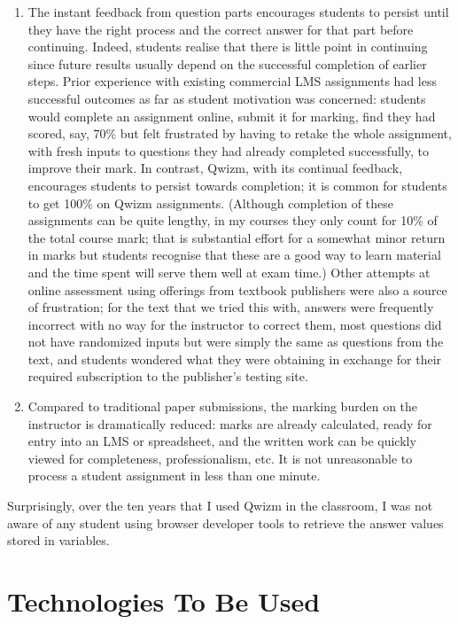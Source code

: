 \documentclass{tufte-handout}
\begin{document}
\begin{enumerate}
	\item The instant feedback from question parts encourages students to persist until they have the right process and the correct answer for that part before continuing. Indeed, students realise that there is little point in continuing since future results usually depend on the successful completion of earlier steps.
	\parm
Prior experience with existing commercial LMS assignments had less successful outcomes as far as student motivation was concerned: students would complete an assignment online, submit it for marking, find they had scored, say, 70\% but felt frustrated by having to retake the whole assignment, with fresh inputs to questions they had already completed successfully, to improve their mark. In contrast, Qwizm, with its continual feedback, encourages students to persist towards completion; it is common for students to get 100\% on Qwizm assignments.
\parm
(Although completion of these assignments can be quite lengthy, in my courses they only count for 10\% of the total course mark; that is substantial effort for a somewhat minor return in marks but students recognise that these are a good way to learn material and the time spent will serve them well at exam time.)
\parm
Other attempts at online assessment using offerings from textbook publishers were also a source of frustration; for the text that we tried this with, answers were frequently incorrect with no way for the instructor to correct them, most questions did not have randomized inputs but were simply the same as questions from the text, and students wondered what they were obtaining in exchange for their required subscription to the publisher's testing site.
	\item Compared to traditional paper submissions, the marking burden on the instructor is dramatically reduced: marks are already calculated, ready for entry into an LMS or spreadsheet, and the written work can be quickly viewed for completeness, professionalism, etc. It is not unreasonable to process a student assignment in less than one minute.
\end{enumerate}

\parb

Surprisingly, over the ten years that I used Qwizm in the classroom, I was not aware of any student using browser developer tools to retrieve the answer values stored in variables.



\section{Technologies To Be Used}\label{sec:technologies}
\end{document}
